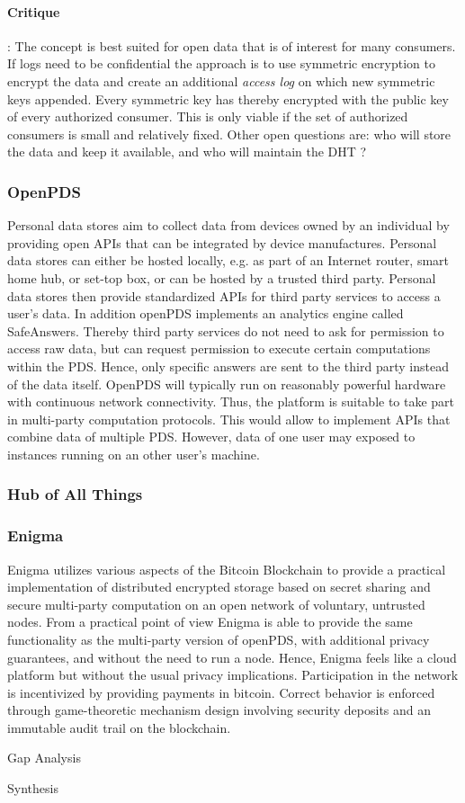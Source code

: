 \paragraph{Critique}: 
The concept is best suited for open data that is of interest for many consumers. If logs need to be confidential the approach is to use symmetric encryption to encrypt the data and create an additional \emph{access log} on which new symmetric keys appended. Every symmetric key has thereby encrypted with the public key of every authorized consumer. This is only viable if the set of authorized consumers is small and relatively fixed. 
Other open questions are: who will store the data and keep it available, and who will maintain the DHT ?


\subsubsection{OpenPDS}

Personal data stores aim to collect data from devices owned by an individual by providing open APIs that can be integrated by device manufactures. Personal data stores can either be hosted locally, e.g. as part of an Internet router, smart home hub, or set-top box, or can be hosted by a trusted third party. Personal data stores then provide standardized APIs for third party services to access a user's data. In addition openPDS implements an analytics engine called SafeAnswers. Thereby third party services do not need to ask for permission to access raw data, but can request permission to execute certain computations within the PDS. Hence, only specific answers are sent to the third party instead of the data itself. OpenPDS will typically run on reasonably powerful hardware with continuous network connectivity. Thus, the platform is suitable to take part in multi-party computation protocols. This would allow to implement APIs that combine data of multiple PDS. However, data of one user may exposed to instances running on an other user's machine. 

\subsubsection{Hub of All Things}

\subsubsection{Enigma}

Enigma utilizes various aspects of the Bitcoin Blockchain to provide a practical implementation of distributed encrypted storage based on secret sharing and secure multi-party computation on an open network of voluntary, untrusted nodes. From a practical point of view Enigma is able to provide the same functionality as the multi-party version of openPDS, with additional privacy guarantees, and without the need to run a node. Hence, Enigma feels like a cloud platform but without the usual privacy implications. Participation in the network is incentivized by providing payments in bitcoin. Correct behavior is enforced through game-theoretic mechanism design involving security deposits and an immutable audit trail on the blockchain. 

Gap Analysis

Synthesis
